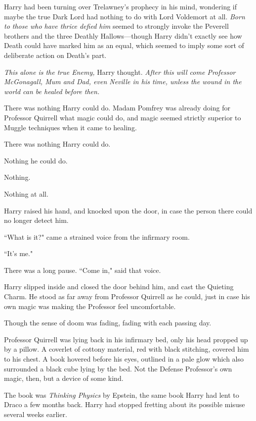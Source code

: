 Harry had been turning over Trelawney's prophecy in his mind, wondering if maybe the true Dark Lord had nothing to do with Lord Voldemort at all. \emph{Born to those who have thrice defied him} seemed to strongly invoke the Peverell brothers and the three Deathly Hallows—though Harry didn't exactly see how Death could have marked him as an equal, which seemed to imply some sort of deliberate action on Death's part.

\emph{This alone is the true Enemy,} Harry thought. \emph{After this will come Professor McGonagall, Mum and Dad, even Neville in his time, unless the wound in the world can be healed before then.}

There was nothing Harry could do. Madam Pomfrey was already doing for Professor Quirrell what magic could do, and magic seemed strictly superior to Muggle techniques when it came to healing.

There was nothing Harry could do.

Nothing he could do.

Nothing.

Nothing at all.

\later

Harry raised his hand, and knocked upon the door, in case the person there could no longer detect him.

``What is it?" came a strained voice from the infirmary room.

``It's me."

There was a long pause. ``Come in," said that voice.

Harry slipped inside and closed the door behind him, and cast the Quieting Charm. He stood as far away from Professor Quirrell as he could, just in case his own magic was making the Professor feel uncomfortable.

Though the sense of doom was fading, fading with each passing day.

Professor Quirrell was lying back in his infirmary bed, only his head propped up by a pillow. A coverlet of cottony material, red with black stitching, covered him to his chest. A book hovered before his eyes, outlined in a pale glow which also surrounded a black cube lying by the bed. Not the Defense Professor's own magic, then, but a device of some kind.

The book was \emph{Thinking Physics} by Epstein, the same book Harry had lent to Draco a few months back. Harry had stopped fretting about its possible misuse several weeks earlier.


